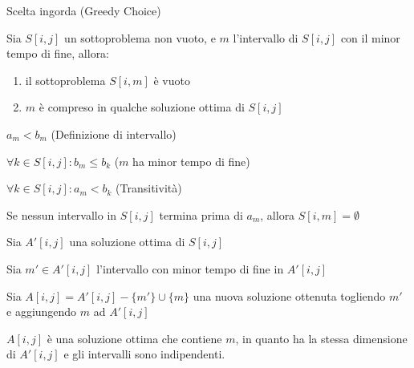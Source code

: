 \begin{frame}{Scelta ingorda (Greedy Choice)}

\vspace{-9pt}
\begin{myboxtitle}[Teorema]
Sia $S[i,j]$ un sottoproblema non vuoto, e $m$ l'intervallo di $S[i,j]$ con il \alert{minor tempo di fine}, allora:
\begin{enumerate}
\item il sottoproblema $S[i,m]$ è vuoto
\item $m$ è compreso in qualche soluzione ottima di $S[i,j]$
\end{enumerate}
\end{myboxtitle}

\vspace{-6pt}
\begin{overprint}
\begin{myboxtitle}

\smallskip
{} \alert{$a_m<b_m$} \hfill (Definizione di intervallo)

\smallskip
{} \alert{$\forall k \in S[i,j]: b_m \leq b_k$} \hfill ($m$ ha minor tempo di fine)

\smallskip
{} \alert{$\forall k \in S[i,j]: a_m < b_k$} \hfill (Transitività)

\bigskip
Se nessun intervallo in $S[i,j]$ termina prima di $a_m$, allora $S[i,m] = \emptyset$
\end{myboxtitle}

\begin{myboxtitle}
\BI
\item Sia \alert{$A'[i,j]$} una soluzione ottima di $S[i,j]$
\item Sia \alert{$m' \in A'[i,j]$} l'intervallo con minor tempo di fine in $A'[i,j]$
\item Sia \alert{$A[i,j] = A'[i,j] - \{ m' \} \cup \{ m \}$} una nuova soluzione
ottenuta togliendo $m'$ e aggiungendo $m$ ad $A'[i,j]$
\item \alert{$A[i,j]$ è una soluzione ottima che contiene $m$}, in quanto ha la 
stessa dimensione di $A'[i,j]$ e gli intervalli sono indipendenti.
\EI
\end{myboxtitle}
\end{overprint}

\end{frame}

